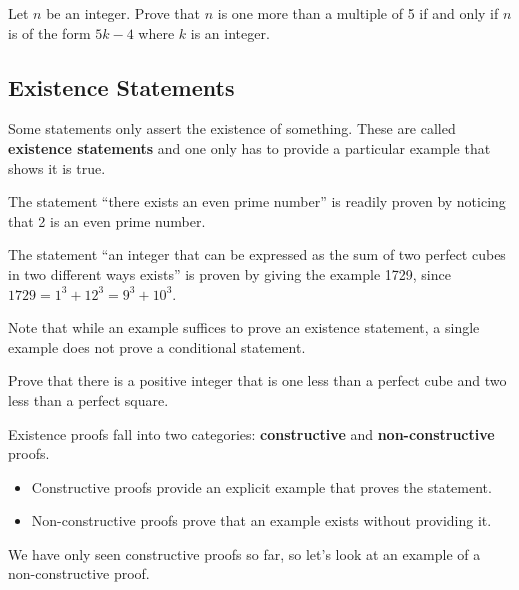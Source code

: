 \begin{exercise}
    Let $n$ be an integer. Prove that $n$ is one more than a multiple of 5 if and only if $n$ is of the form $5k - 4$ where $k$ is an integer.
\end{exercise}

\subsection{Existence Statements}
Some statements only assert the existence of something. These are called \textbf{existence statements} and one only has to provide a particular example that shows it is true. 
\begin{example}
    The statement ``there exists an even prime number'' is readily proven by noticing that 2 is an even prime number.
\end{example}

\newpage

\begin{example}
    The statement ``an integer that can be expressed as the sum of two perfect cubes in two different ways exists'' is proven by giving the example 1729, since $1729 = 1^3 + 12^3 = 9^3 + 10^3$.
\end{example}
Note that while an example suffices to prove an existence statement, a single example does not prove a conditional statement.
\begin{exercise}
    Prove that there is a positive integer that is one less than a perfect cube and two less than a perfect square.
\end{exercise}

Existence proofs fall into two categories: \textbf{constructive} and \textbf{non-constructive} proofs.
\begin{itemize}
    \item Constructive proofs provide an explicit example that proves the statement.
    \item Non-constructive proofs prove that an example exists without providing it.
\end{itemize}
We have only seen constructive proofs so far, so let's look at an example of a non-constructive proof.

